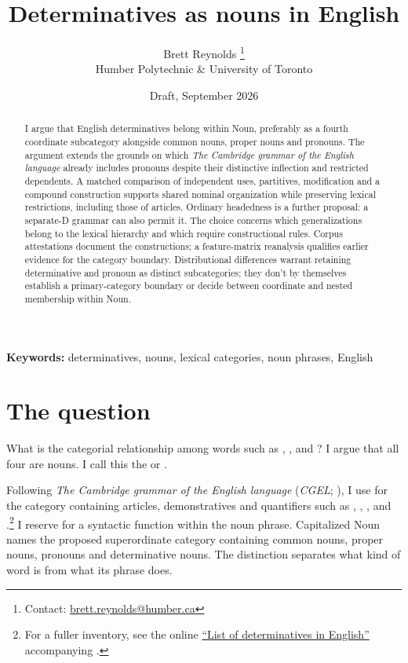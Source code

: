 \documentclass[12pt]{article}
\title{Determinatives as nouns in English}
\author{Brett Reynolds \orcidlink{0000-0003-0073-7195}%
\thanks{Contact: \href{mailto:brett.reynolds@humber.ca}{brett.reynolds@humber.ca}}\\
Humber Polytechnic \& University of Toronto}
\date{Draft, September 2026}
\begin{document}
\maketitle

\begin{abstract}
I argue that English determinatives belong within Noun, preferably as a fourth coordinate subcategory alongside common nouns, proper nouns and pronouns. The argument extends the grounds on which \textit{The Cambridge grammar of the English language} already includes pronouns despite their distinctive inflection and restricted dependents. A matched comparison of independent uses, partitives, modification and a compound construction supports shared nominal organization while preserving lexical restrictions, including those of articles. Ordinary headedness is a further proposal: a separate-D grammar can also permit it. The choice concerns which generalizations belong to the lexical hierarchy and which require constructional rules. Corpus attestations document the constructions; a feature-matrix reanalysis qualifies earlier evidence for the category boundary. Distributional differences warrant retaining determinative and pronoun as distinct subcategories; they don't by themselves establish a primary-category boundary or decide between coordinate and nested membership within Noun.
\end{abstract}

\noindent\textbf{Keywords:} determinatives, nouns, lexical categories, noun phrases, English

\section{The question}\label{sec:intro}

What is the categorial relationship among words such as , ,  and ? I argue that all four are nouns. I call this the  or .

Following \textit{The Cambridge grammar of the English language} (\textit{CGEL}; \citealt{huddleston2002}), I use  for the category containing articles, demonstratives and quantifiers such as , , ,  and .\footnote{For a fuller inventory, see the online \href{https://www.cambridge.org/highereducation/api/resources/2AC8DF5CA558F8A6FCDFACD0EAF8EA08}{\enquote{List of determinatives in English}} accompanying \textcite{Huddleston2021}.} I reserve  for a syntactic function within the noun phrase. Capitalized Noun names the proposed superordinate category containing common nouns, proper nouns, pronouns and determinative nouns. The distinction separates what kind of word  is from what its phrase does.
\end{document}
